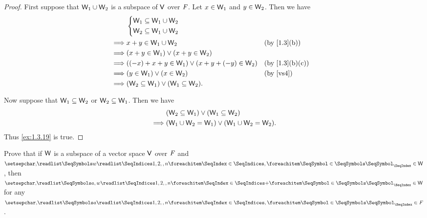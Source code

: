 \begin{proof}
  First suppose that \(\mathsf{W}_{1} \cup \mathsf{W}_{2}\) is a subspace of \(\mathsf{V}\) over \(\mathit{F}\).
  Let \(x \in \mathsf{W}_{1}\) and \(y \in \mathsf{W}_{2}\).
  Then we have
  \begin{align*}
             & \begin{dcases}
      \W_{1} \subseteq \W_{1} \cup \W_{2} \\
      \W_{2} \subseteq \W_{1} \cup \W_{2}
    \end{dcases}                                                                         \\
    \implies & x + y \in \W_{1} \cup \W_{2}                                     &  & \text{(by \cref{1.3}(b))}    \\
    \implies & \p{x + y \in \W_{1}} \lor \p{x + y \in \W_{2}}                                                     \\
    \implies & \p{\p{-x} + x + y \in \W_{1}} \lor \p{x + y + \p{-y} \in \W_{2}} &  & \text{(by \cref{1.3}(b)(c))} \\
    \implies & \p{y \in \W_{1}} \lor \p{x \in \W_{2}}                           &  & \text{(by \ref{vs4})}        \\
    \implies & \p{\W_{2} \subseteq \W_{1}} \lor \p{\W_{1} \subseteq \W_{2}}.
  \end{align*}

  Now suppose that \(\mathsf{W}_{1} \subseteq \mathsf{W}_{2}\) or \(\mathsf{W}_{2} \subseteq \mathsf{W}_{1}\).
  Then we have
  \begin{align*}
             & \p{\W_{2} \subseteq \W_{1}} \lor \p{\W_{1} \subseteq \W_{2}}          \\
    \implies & \p{\W_{1} \cup \W_{2} = \W_{1}} \lor \p{\W_{1} \cup \W_{2} = \W_{2}}.
  \end{align*}
  Thus \cref{ex:1.3.19} is true.
\end{proof}

\begin{ex}\label{ex:1.3.20}
  Prove that if \(\mathsf{W}\) is a subspace of a vector space \(\mathsf{V}\) over \(\mathit{F}\) and \(\seq{w}{1,2,,n} \in \W\), then \(\seq[+]{a,w}{1,2,,n} \in \W\) for any \(\seq{a}{1,2,,n} \in \F\).
\end{ex}


